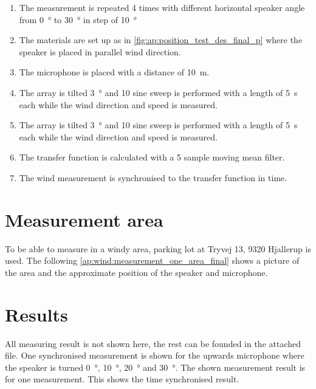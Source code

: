 \begin{enumerate}
\item The measurement is repeated 4 times with different horizontal speaker angle from \SI{0}{\degree} to \SI{30}{\degree} in step of \SI{10}{\degree}
\item The materials are set up as in \autoref{fig:ap:position_test_des_final_p} where the speaker is placed in parallel wind direction.
\item The microphone is placed with a distance of \SI{10}{\meter}.
\item The array is tilted \SI{3}{\degree} and 10 sine sweep is performed with a length of \SI{5}{\second} each while the wind direction and speed is measured.
\item The array is tilted \SI{3}{\degree} and 10 sine sweep is performed with a length of \SI{5}{\second} each while the wind direction and speed is measured.
\item The transfer function is calculated with a 5 sample moving mean filter.
\item The wind measurement is synchronised to the transfer function in time. 
\end{enumerate}


\section*{Measurement area}
To be able to measure in a windy area, parking lot at Tryvej 13, 9320 Hjallerup is used. The following \autoref{ap:wind:measurement_one_area_final} shows a picture of the area and the approximate position of the speaker and microphone.


\section*{Results}

All measuring result is not shown here, the rest can be founded in the attached file. One synchronised measurement is shown for the upwards microphone where the speaker is turned \SI{0}{\degree}, \SI{10}{\degree}, \SI{20}{\degree} and \SI{30}{\degree}. The shown measurement result is for one measurement. This shows the time synchronised result. 











